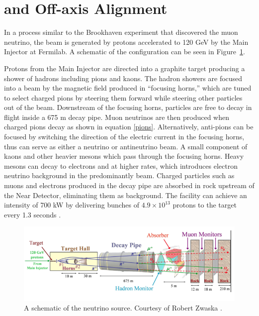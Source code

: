 \section{\numi and  Off-axis Alignment }\label{sec:numi}

In a process similar to the Brookhaven experiment that discovered the muon neutrino, the \numi beam is generated by protons accelerated to 120 GeV by the Main Injector at Fermilab.  A schematic of the \numi configuration can be seen in Figure~\ref{numi}.

Protons from the Main Injector are directed into a graphite target producing a shower of hadrons including pions and kaons.  The hadron showers are focused into a beam by the magnetic field produced in ``focusing horns,'' which are tuned to select charged pions by steering them forward while steering other particles out of the beam.  Downstream of the focusing horns, particles are free to decay in flight inside a 675 m decay pipe.  Muon neutrinos are then produced when charged pions decay as shown in equation \eqref{pions}.  Alternatively, anti-pions can be focused by switching the direction of the electric current in the focusing horns, thus \numi can serve as either a neutrino or antineutrino beam.  A small component of kaons and other heavier mesons which pass through the focusing horns.  Heavy mesons can decay to electrons and \nue at higher rates, which introduces electron neutrino background in the predominantly \numu beam.  Charged particles such as muons and electrons produced in the decay pipe are absorbed in rock upstream of the \nova Near Detector, eliminating them as background.  The \numi facility can achieve an intensity of 700 kW by delivering bunches of $4.9 \times 10^{13}$ protons to the target every 1.3 seconds \cite{tdr}.

\begin{figure}[t]
  \begin{center}
    \includegraphics[width=\textwidth]{figures/figures/numi.png}
  \end{center}
  \caption[A schematic of the \numi neutrino source.]{A schematic of the \numi neutrino source.  Courtesy of Robert Zwaska \cite{zwaska2005thesis}.}
  \label{numi}
\end{figure}

